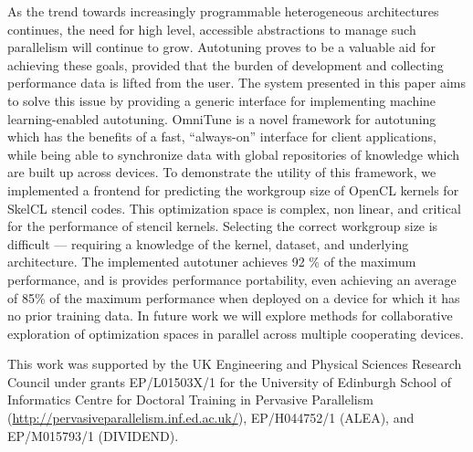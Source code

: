 \documentclass[nonatbib,preprint,nocopyrightspace,9pt]{sigplanconf}
\begin{document}
As the trend towards increasingly programmable heterogeneous
architectures continues, the need for high level, accessible
abstractions to manage such parallelism will continue to
grow. Autotuning proves to be a valuable aid for achieving these
goals, provided that the burden of development and collecting
performance data is lifted from the user. The system presented in this
paper aims to solve this issue by providing a generic interface for
implementing machine learning-enabled autotuning. OmniTune is a novel
framework for autotuning which has the benefits of a fast, ``always-on''
interface for client applications, while being able to synchronize
data with global repositories of knowledge which are built up across
devices. To demonstrate the utility of this framework, we implemented
a frontend for predicting the workgroup size of OpenCL kernels for
SkelCL stencil codes. This optimization space is complex, non linear,
and critical for the performance of stencil kernels. Selecting the
correct workgroup size is difficult --- requiring a knowledge of the
kernel, dataset, and underlying architecture. The implemented
autotuner achieves 92 \% of the maximum performance, and is provides
performance portability, even achieving an average of 85\% of the
maximum performance when deployed on a device for which it has no
prior training data. In future work we will explore methods for
collaborative exploration of optimization spaces in parallel across
multiple cooperating devices.

\acks

This work was supported by the UK Engineering and Physical Sciences
Research Council under grants EP/L01503X/1 for the University of
Edinburgh School of Informatics Centre for Doctoral Training in
Pervasive Parallelism
(\url{http://pervasiveparallelism.inf.ed.ac.uk/}), EP/H044752/1
(ALEA), and EP/M015793/1 (DIVIDEND).

\label{bibliography}
\printbibliography
\end{document}
